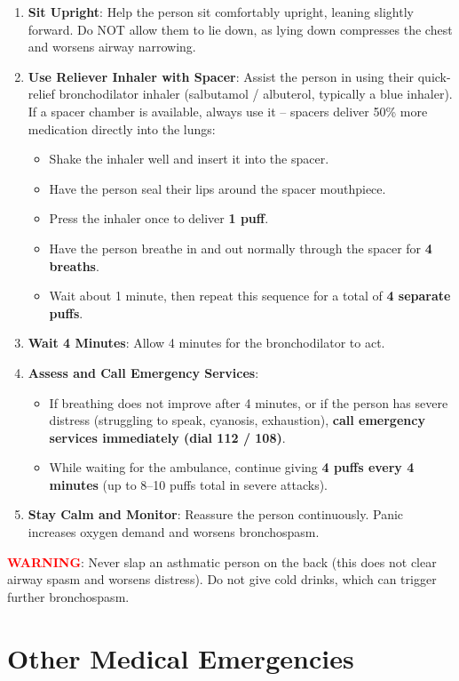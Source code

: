 \begin{enumerate}[leftmargin=*]
\item \textbf{Sit Upright}: Help the person sit comfortably upright, leaning slightly forward. Do NOT allow them to lie down, as lying down compresses the chest and worsens airway narrowing.
\item \textbf{Use Reliever Inhaler with Spacer}: Assist the person in using their quick-relief bronchodilator inhaler (salbutamol / albuterol, typically a blue inhaler). If a spacer chamber is available, always use it -- spacers deliver 50\% more medication directly into the lungs:
  \begin{itemize}
    \item Shake the inhaler well and insert it into the spacer.
    \item Have the person seal their lips around the spacer mouthpiece.
    \item Press the inhaler once to deliver \textbf{1 puff}.
    \item Have the person breathe in and out normally through the spacer for \textbf{4 breaths}.
    \item Wait about 1 minute, then repeat this sequence for a total of \textbf{4 separate puffs}.
  \end{itemize}
\item \textbf{Wait 4 Minutes}: Allow 4 minutes for the bronchodilator to act.
\item \textbf{Assess and Call Emergency Services}:
  \begin{itemize}
    \item If breathing does not improve after 4 minutes, or if the person has severe distress (struggling to speak, cyanosis, exhaustion), \textbf{call emergency services immediately (dial 112 / 108)}.
    \item While waiting for the ambulance, continue giving \textbf{4 puffs every 4 minutes} (up to 8--10 puffs total in severe attacks).
  \end{itemize}
\item \textbf{Stay Calm and Monitor}: Reassure the person continuously. Panic increases oxygen demand and worsens bronchospasm.
\end{enumerate}
\noindent\textbf{\textcolor{red}{WARNING}}: Never slap an asthmatic person on the back (this does not clear airway spasm and worsens distress). Do not give cold drinks, which can trigger further bronchospasm.

\section{Other Medical Emergencies}

